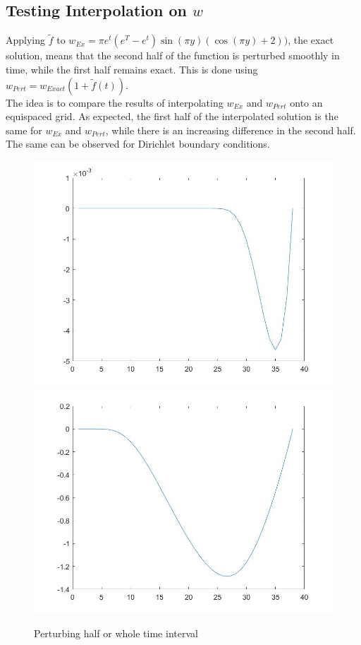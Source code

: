 \documentclass[11pt, a4paper]{article}
\theoremstyle{definition}
\begin{document}
\subsection*{Testing Interpolation on $w$}
Applying $\tilde f$ to $w_{Ex} = \pi e^t(e^T - e^t) \sin(\pi y)(\cos(\pi y)+2))$, the exact solution, means that the second half of the function is perturbed smoothly in time, while the first half remains exact. This is done using $w_{Pert} = w_{Exact}(1 + \tilde f(t))$.\\
The idea is to compare the results of interpolating $w_{Ex}$ and $w_{Pert}$ onto an equispaced grid.
As expected, the first half of the interpolated solution is the same for $w_{Ex}$ and $w_{Pert}$, while there is an increasing difference in the second half.\\
The same can be observed for Dirichlet boundary conditions.
\begin{figure}[h]
	\includegraphics[scale=0.3]{wperthalf.jpg}
	\includegraphics[scale=0.3]{wpertfull.jpg}
	\caption{Perturbing half or whole time interval}
\end{figure}
\end{document}
